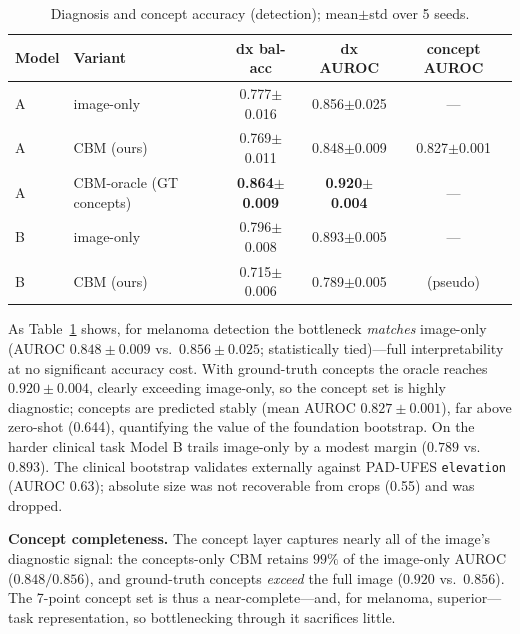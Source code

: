 \documentclass{svproc}
\begin{document}
\begin{table}[t]
\caption{Diagnosis and concept accuracy (detection); mean$\pm$std over 5 seeds.}
\label{tab:exp1}
\begin{center}
\begin{tabular}{llccc}
\hline\rule{0pt}{12pt}
Model & Variant & dx bal-acc & dx AUROC & concept AUROC\\[2pt]
\hline\rule{0pt}{12pt}
A & image-only & 0.777$\pm$0.016 & 0.856$\pm$0.025 & ---\\
A & CBM (ours) & 0.769$\pm$0.011 & 0.848$\pm$0.009 & 0.827$\pm$0.001\\
A & CBM-oracle (GT concepts) & \textbf{0.864$\pm$0.009} & \textbf{0.920$\pm$0.004} & ---\\
B & image-only & 0.796$\pm$0.008 & 0.893$\pm$0.005 & ---\\
B & CBM (ours) & 0.715$\pm$0.006 & 0.789$\pm$0.005 & (pseudo)\\[2pt]
\hline
\end{tabular}
\end{center}
\end{table}

As Table~\ref{tab:exp1} shows, for melanoma detection the bottleneck \emph{matches}
image-only (AUROC $0.848\pm0.009$ vs.\ $0.856\pm0.025$; statistically tied)---full
interpretability at no significant accuracy cost. With ground-truth concepts the oracle
reaches $0.920\pm0.004$, clearly exceeding image-only, so the concept set is highly
diagnostic; concepts are predicted stably (mean AUROC $0.827\pm0.001$), far above
zero-shot (0.644), quantifying the value of the foundation bootstrap. On the harder
clinical task Model B trails image-only by a modest margin ($0.789$ vs.\ $0.893$). The
clinical bootstrap validates externally against PAD-UFES \texttt{elevation} (AUROC
0.63); absolute size was not recoverable from crops (0.55) and was dropped.

\noindent\textbf{Concept completeness.} The concept layer captures nearly all of the
image's diagnostic signal: the concepts-only CBM retains $99\%$ of the image-only AUROC
($0.848/0.856$), and ground-truth concepts \emph{exceed} the full image ($0.920$ vs.\
$0.856$). The 7-point concept set is thus a near-complete---and, for melanoma,
superior---task representation, so bottlenecking through it sacrifices little.
\end{document}
